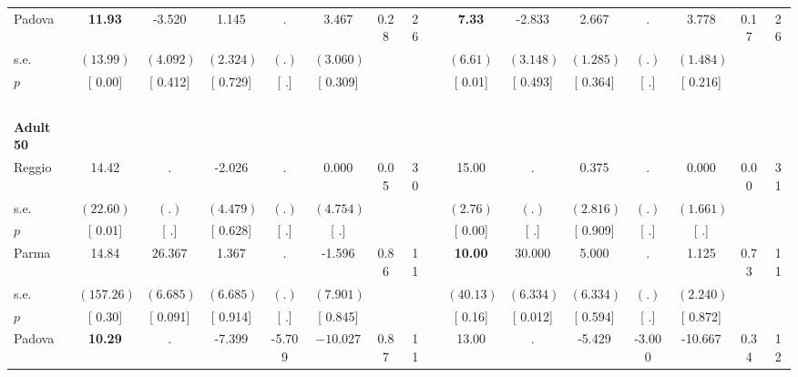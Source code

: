 \begin{longtable}{L{8em} c c c c c c c p{1em} c c c c c c c}
\quad \quad \quad Padova& \textbf{    11.93} &    -3.520 &     1.145 &         . &     3.467 &      0.28 &        26 & & \textbf{     7.33} &    -2.833 &     2.667 &         . &     3.778 &      0.17 &        26  \\*
\quad \quad \quad \quad s.e.& $ (    13.99)$ & $ (    4.092)$ & $ (    2.324)$ & $ (        .)$ & $ (    3.060)$ & & & & $ (     6.61)$ & $ (    3.148)$ & $ (    1.285)$ & $ (        .)$ & $ (    1.484)$ & &  \\*
\quad \quad \quad \quad $ p$ & [     0.00] & [    0.412] & [    0.729] & [        .] & [    0.309] & & & & [     0.01] & [    0.493] & [    0.364] & [        .] & [    0.216] & &  \\[1em]
~\\[1em]
\quad \quad \textbf{Adult 50} & & & & & & & & & & & & & & & \\* 
\quad \quad \quad Reggio& 14.42 &         . &    -2.026 &         . &     0.000 &      0.05 &        30 & & 15.00 &         . &     0.375 &         . &     0.000 &      0.00 &        31  \\*
\quad \quad \quad \quad s.e.& $ (    22.60)$ & $ (        .)$ & $ (    4.479)$ & $ (        .)$ & $ (    4.754)$ & & & & $ (     2.76)$ & $ (        .)$ & $ (    2.816)$ & $ (        .)$ & $ (    1.661)$ & &  \\*
\quad \quad \quad \quad $ p$ & [     0.01] & [        .] & [    0.628] & [        .] & [        .] & & & & [     0.00] & [        .] & [    0.909] & [        .] & [        .] & &  \\[1em]
\quad \quad \quad Parma& 14.84 & $ \mathbf{   26.367}$ &     1.367 &         . &    -1.596 &      0.86 &        11 & & \textbf{    10.00} & $ \mathbf{   30.000}$ &     5.000 &         . &     1.125 &      0.73 &        11  \\*
\quad \quad \quad \quad s.e.& $ (   157.26)$ & $ (    6.685)$ & $ (    6.685)$ & $ (        .)$ & $ (    7.901)$ & & & & $ (    40.13)$ & $ (    6.334)$ & $ (    6.334)$ & $ (        .)$ & $ (    2.240)$ & &  \\*
\quad \quad \quad \quad $ p$ & [     0.30] & [    0.091] & [    0.914] & [        .] & [    0.845] & & & & [     0.16] & [    0.012] & [    0.594] & [        .] & [    0.872] & &  \\[1em]
\quad \quad \quad Padova& \textbf{    10.29} &         . &    -7.399 &    -5.709 & $ \mathbf{  -10.027}$ &      0.87 &        11 & & 13.00 &         . &    -5.429 &    -3.000 &   -10.667 &      0.34 &        12  \\*

\end{longtable}
